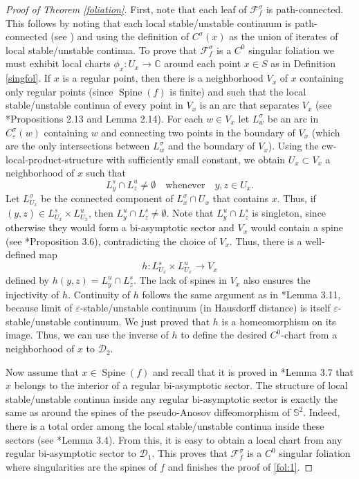 \documentclass{amsart}
\theoremstyle{plain}
\theoremstyle{definition}
\newcommand{\C}{\mathbb{C}}
\newcommand{\mc}{\mathcal}
\newcommand{\spine}{\operatorname{Spine}}
\newcommand{\eps}{\varepsilon}
\begin{document}
\begin{proof}[Proof of Theorem \ref{foliation}]
First, note that each leaf of $\mc{F}^\sigma_f$ is path-connected. This follows by noting that each local stable/unstable continuum is path-connected (see \cite[Corollary 2.7]{ACS}) and using the definition of $C^{\sigma}(x)$ as the union of iterates of local stable/unstable continua. To prove that $\mc{F}^\sigma_f$ is a $C^0$ singular foliation we must exhibit local charts $\phi_x\colon U_x\to\C$ around each point $x\in S$ as in Definition \ref{singfol}. If $x$ is a regular point, then there is a neighborhood $V_x$ of $x$ containing only regular points (since $\spine(f)$ is finite) and such that the local stable/unstable continua of every point in $V_x$ is an arc that separates $V_x$ (see \cite{ACS}*{Propositions 2.13 and Lemma 2.14}). For each $w\in V_x$ let $L^{\sigma}_w$ be an arc in $C^{\sigma}_{\eps}(w)$ containing $w$ and connecting two points in the boundary of $V_x$ (which are the only intersections between $L^{\sigma}_w$ and the boundary of $V_x$). Using the cw-local-product-structure with sufficiently small constant, we obtain
$U_x\subset V_x$ a neighborhood of $x$ such that 
$$L^s_y\cap L^u_z\neq\emptyset \,\,\,\,\,\, \text{whenever} \,\,\,\,\,\, y,z\in U_x.$$ Let $L^{\sigma}_{U_x}$ be the connected component of $L^{\sigma}_x\cap U_x$ that contains $x$. Thus, if $(y,z)\in L^s_{U_x}\times L^u_{U_x}$, then $L^u_y\cap L^s_z\neq\emptyset$. Note that $L^u_y\cap L^s_z$ is singleton, since otherwise they would form a bi-asymptotic sector and $V_x$ would contain a spine (see \cite{ACS}*{Proposition 3.6}), contradicting the choice of $V_x$. Thus, there is a well-defined map $$h\colon L^s_{U_x}\times L^u_{U_x}\to V_x$$ defined by $h(y,z)=L^u_y\cap L^s_z$. The lack of spines in $V_x$ also ensures the injectivity of $h$. Continuity of $h$ follows the same argument as in \cite{APV}*{Lemma 3.11}, %
because limit of $\eps$-stable/unstable continuum (in Hausdorff distance) is itself $\eps$-stable/unstable continuum. We just proved that $h$ is a homeomorphism on its image.
Thus, we can use the inverse of $h$ to define the desired $C^0$-chart from a neighborhood of $x$ to $\mc{D}_2$.

Now assume that $x\in\spine(f)$ and recall that it is proved in \cite{ACS}*{Lemma 3.7} that $x$ belongs to the interior of a regular bi-asymptotic sector. The structure of local stable/unstable continua inside any regular bi-asymptotic sector is exactly the same as around the spines of the pseudo-Anosov diffeomorphism of $\mathbb{S}^2$. Indeed, there is a total order among the local stable/unstable continua inside these sectors (see \cite{ACS}*{Lemma 3.4}). From this, it is easy to obtain a local chart from any regular bi-asymptotic sector to $\mc{D}_1$. This proves that $\mc{F}^\sigma_f$ is a $C^0$ singular foliation where singularities are the spines of $f$ and finishes the proof of \eqref{fol:1}.


\end{proof}
\end{document}
